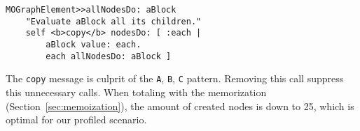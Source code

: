 \documentclass{sig-alternate}
\newcommand{\ct}{\lstinline[backgroundcolor=\color{white},basicstyle=\footnotesize\ttfamily]}
\newcommand{\ab}[1]{\nb{Alexandre}{blue}{#1}}
\newcommand{\figref}[1]{Figure~\ref{fig:#1}}
\newcommand{\secref}[1]{Section~\ref{sec:#1}}
\begin{document}
\begin{lstlisting}[]
MOGraphElement>>allNodesDo: aBlock
	"Evaluate aBlock all its children."
	self <b>copy</b> nodesDo: [ :each |
		aBlock value: each.
		each allNodesDo: aBlock ]
\end{lstlisting} 

The \ct{copy} message is culprit of the \ct{A}, \ct{B}, \ct{C} pattern. Removing this call suppress this unnecessary calls. When totaling with the memorization (\secref{memoization}), the amount of created nodes is down to 25, which is optimal for our profiled scenario.


%
%
%
%
%
%
\end{document}
